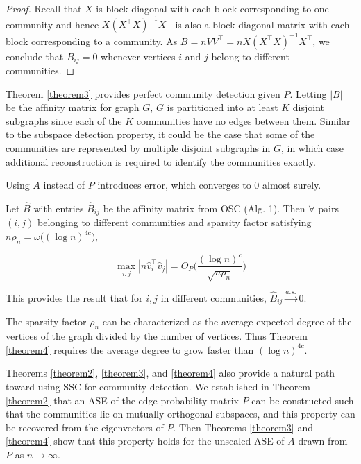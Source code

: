\documentclass[12pt]{article}
\begin{document}
\begin{proof}
Recall that \(X\) is block diagonal with each block
corresponding to one community and hence \(X (X^\top X)^{-1} X^\top\) is also a
block diagonal matrix with each block corresponding to a community. As $B = n VV^{\top} = n X (X^\top X)^{-1} X^\top$, we
conclude that $B_{ij} = 0$ whenever vertices $i$ and $j$ belong to different communities.  
\end{proof}


Theorem \ref{theorem3} provides perfect community detection given \(P\).
Letting \(|B|\) be the affinity matrix for graph \(G\), \(G\) is
partitioned into at least \(K\) disjoint subgraphs since each of the
\(K\) communities have no edges between them. Similar to the subspace
detection property, it could be the case that some of the communities
are represented by multiple disjoint subgraphs in \(G\), in which case
additional reconstruction is required to identify the communities
exactly.

Using \(A\) instead of \(P\) introduces error, which converges to \(0\)
almost surely. 

\begin{theorem}
\label{theorem4}
Let $\hat{B}$ with entries $\hat{B}_{ij}$ be the affinity matrix from OSC
(Alg. 1). Then $\forall$ pairs $(i, j)$ belonging to different communities
and sparsity factor satisfying $n \rho_n = \omega \big( (\log n)^{4c} \big)$,

\begin{equation} \label{eq:thm4}
\max_{i, j} |n \hat{v}_i^\top \hat{v}_j| =
O_P \Big( \frac{(\log n)^c}{\sqrt{n \rho_n}} \Big)
\end{equation}

This provides the result that for $i, j$ in different communities,
$\hat{B}_{ij} \stackrel{a.s.}{\to} 0$.
\end{theorem}

The sparsity factor $\rho_n$ can be characterized as 
the average expected degree of the vertices of the graph 
divided by the number of vertices. 
Thus Theorem \ref{theorem4} requires the average degree 
to grow faster than $(\log n)^{4c}$.

Theorems \ref{theorem2}, \ref{theorem3}, and \ref{theorem4} also provide
a natural path toward using SSC for community detection. 
We established in Theorem \ref{theorem2} that an ASE of the edge
probability matrix \(P\) can be constructed such that the communities
lie on mutually orthogonal subspaces, and this property can be recovered
from the eigenvectors of \(P\). Then Theorems \ref{theorem3} and
\ref{theorem4} show that this property holds for the unscaled ASE of
\(A\) drawn from \(P\) as \(n \to \infty\).
\end{document}
